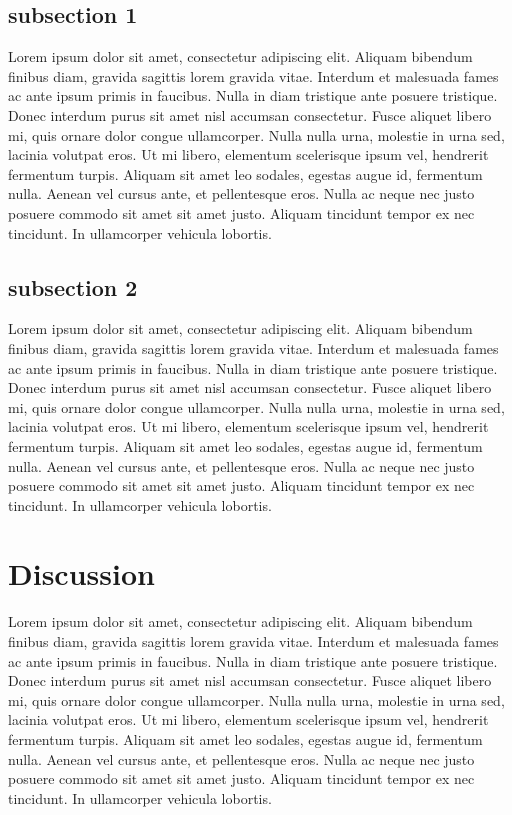 \documentclass[10pt,letterpaper,twocolumn]{article}
\begin{document}
\subsection*{subsection 1}
Lorem ipsum dolor sit amet, consectetur adipiscing elit. Aliquam bibendum
finibus diam, gravida sagittis lorem gravida vitae. Interdum et malesuada fames
ac ante ipsum primis in faucibus. Nulla in diam tristique ante posuere
tristique. Donec interdum purus sit amet nisl accumsan consectetur. Fusce
aliquet libero mi, quis ornare dolor congue ullamcorper. Nulla nulla urna,
molestie in urna sed, lacinia volutpat eros. Ut mi libero, elementum scelerisque
ipsum vel, hendrerit fermentum turpis. Aliquam sit amet leo sodales, egestas
augue id, fermentum nulla. Aenean vel cursus ante, et pellentesque eros. Nulla
ac neque nec justo posuere commodo sit amet sit amet justo. Aliquam tincidunt
tempor ex nec tincidunt. In ullamcorper vehicula lobortis.

\subsection*{subsection 2}
Lorem ipsum dolor sit amet, consectetur adipiscing elit. Aliquam bibendum
finibus diam, gravida sagittis lorem gravida vitae. Interdum et malesuada fames
ac ante ipsum primis in faucibus. Nulla in diam tristique ante posuere
tristique. Donec interdum purus sit amet nisl accumsan consectetur. Fusce
aliquet libero mi, quis ornare dolor congue ullamcorper. Nulla nulla urna,
molestie in urna sed, lacinia volutpat eros. Ut mi libero, elementum scelerisque
ipsum vel, hendrerit fermentum turpis. Aliquam sit amet leo sodales, egestas
augue id, fermentum nulla. Aenean vel cursus ante, et pellentesque eros. Nulla
ac neque nec justo posuere commodo sit amet sit amet justo. Aliquam tincidunt
tempor ex nec tincidunt. In ullamcorper vehicula lobortis.

\section*{Discussion}

Lorem ipsum dolor sit amet, consectetur adipiscing elit. Aliquam bibendum
finibus diam, gravida sagittis lorem gravida vitae. Interdum et malesuada fames
ac ante ipsum primis in faucibus. Nulla in diam tristique ante posuere
tristique. Donec interdum purus sit amet nisl accumsan consectetur. Fusce
aliquet libero mi, quis ornare dolor congue ullamcorper. Nulla nulla urna,
molestie in urna sed, lacinia volutpat eros. Ut mi libero, elementum scelerisque
ipsum vel, hendrerit fermentum turpis. Aliquam sit amet leo sodales, egestas
augue id, fermentum nulla. Aenean vel cursus ante, et pellentesque eros. Nulla
ac neque nec justo posuere commodo sit amet sit amet justo. Aliquam tincidunt
tempor ex nec tincidunt. In ullamcorper vehicula lobortis.


{}
\end{document}

